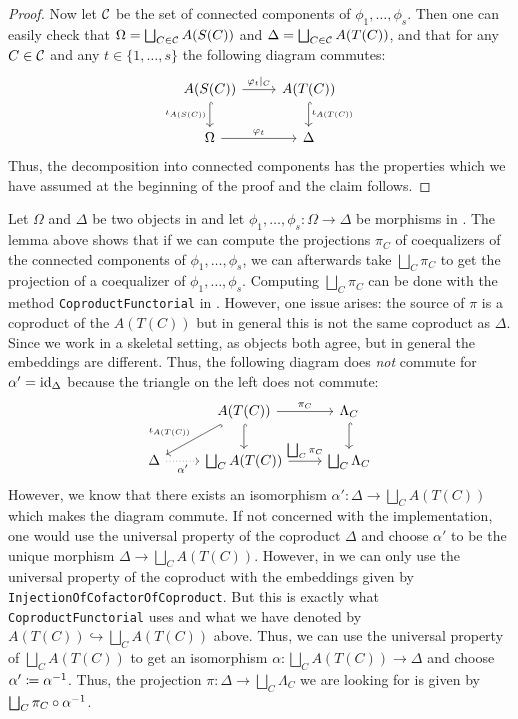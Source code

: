 \begin{proof}
Now let $\mathcal{C}$ be the set of connected components of $\phi_1,\dots,\phi_s$. Then one can easily check that $\Omega = \bigsqcup_{C \in \mathcal{C}} A(S(C))$ and $\Delta = \bigsqcup_{C \in \mathcal{C}} A(T(C))$, and that for any $C \in \mathcal{C}$ and any $t \in \{1,\dots,s\}$ the following diagram commutes:
\[
\begin{tikzcd}
A(S(C)) \arrow[d, "\iota_{A(S(C))}"', hook] \arrow[r, "\phi_t\vert_C"] & A(T(C)) \arrow[d, "\iota_{A(T(C))}", hook] \\
\Omega \arrow[r, "\phi_t"]                                             & \Delta                                      
\end{tikzcd}
\]
Thus, the decomposition into connected components has the properties which we have assumed at the beginning of the proof and the claim follows.
\end{proof}

\begin{rem}[Implementation]\label{rem:CoproductFunctorial}
Let $\Omega$ and $\Delta$ be two objects in \SkeletalGSets{} and let $\phi_1,\dots,\phi_s\colon \Omega \to \Delta$ be morphisms in \SkeletalGSets{}. The lemma above shows that if we can compute the projections $\pi_C$ of coequalizers of the connected components of $\phi_1,\dots,\phi_s$, we can afterwards take $\bigsqcup_C \pi_C$ to get the projection of a coequalizer of $\phi_1,\dots,\phi_s$. Computing $\bigsqcup_C \pi_C$ can be done with the method \texttt{CoproductFunctorial} in \CapPkg{}. However, one issue arises: the source of $\pi$ is a coproduct of the $A(T(C))$ but in general this is not the same coproduct as $\Delta$. Since we work in a skeletal setting, as objects both agree, but in general the embeddings are different. Thus, the following diagram does \emph{not} commute for $\alpha' = \operatorname{id}_\Delta$ because the triangle on the left does not commute:
\[
\begin{tikzcd}
                                     & A(T(C)) \arrow[r, "\pi_C"] \arrow[ld, "\iota_{A(T(C))}"', hook] \arrow[d, hook] & \Lambda_C \arrow[d, hook] \\
\Delta \arrow[r, "\alpha'"', dotted] & \bigsqcup_C A(T(C)) \arrow[r, "\bigsqcup_C \pi_C"]                           & \bigsqcup_C \Lambda_C    
\end{tikzcd}
\]
However, we know that there exists an isomorphism $\alpha'\colon\Delta \to \bigsqcup_C A(T(C))$ which makes the diagram commute. If not concerned with the implementation, one would use the universal property of the coproduct $\Delta$ and choose $\alpha'$ to be the unique morphism $\Delta \to \bigsqcup_C A(T(C))$. However, in \CapPkg{} we can only use the universal property of the coproduct with the embeddings given by \texttt{InjectionOfCofactorOfCoproduct}. But this is exactly what \texttt{CoproductFunctorial} uses and what we have denoted by $A(T(C)) \hookrightarrow \bigsqcup_C A(T(C))$ above. Thus, we can use the universal property of $\bigsqcup_C A(T(C))$ to get an isomorphism $\alpha\colon\bigsqcup_C A(T(C)) \to \Delta$ and choose $\alpha' \coloneqq \alpha^{-1}$. Thus, the projection $\pi\colon \Delta \to \bigsqcup_C \Lambda_C$ we are looking for is given by $\bigsqcup_C \pi_C \circ \alpha^{-1}$.
\end{rem}

